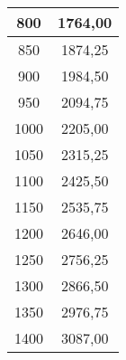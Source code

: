 \begin{table}[!ht]
\begin{tabular}{|c|c|}
      800 & 1764,00 \\ \hline
      850 & 1874,25 \\ \hline
      900 & 1984,50 \\ \hline
      950 & 2094,75 \\ \hline
      1000 & 2205,00 \\ \hline
      1050 & 2315,25 \\ \hline
      1100 & 2425,50 \\ \hline
      1150 & 2535,75 \\ \hline
      1200 & 2646,00 \\ \hline
      1250 & 2756,25 \\ \hline
      1300 & 2866,50 \\ \hline
      1350 & 2976,75 \\ \hline
      1400 & 3087,00 \\ \hline
  \end{tabular}
\end{table}

\newpage

